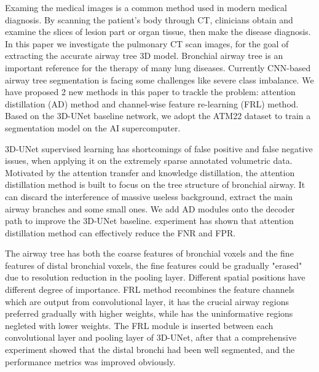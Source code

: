 \begin{abstract*}
  Examing the medical images is a common method used in modern medical diagnosis. By scanning the patient's body through CT, 
  clinicians obtain and examine the slices of lesion part or organ tissue, then make the disease diagnosis. In this paper we
  investigate the pulmonary CT scan images, for the goal of extracting the accurate airway tree 3D model. Bronchial airway
  tree is an important reference for the therapy of many lung diseases. Currently CNN-based airway tree segmentation is facing 
  some challenges like severe class imbalance. We have proposed 2 new methods in this paper to trackle the problem: attention distillation (AD) method 
  and channel-wise feature re-learning (FRL) method. Based on the 3D-UNet baseline network, we adopt the ATM22 dataset to train a segmentation model on
  the AI supercomputer.

  3D-UNet supervised learning has shortcomings of false positive and false negative issues, when applying it on the extremely sparse annotated volumetric 
  data. Motivated by the attention transfer and knowledge distillation, the attention distillation method is built to focus on the tree structure of bronchial
  airway. It can discard the interference of massive useless background, extract the main airway branches and some small ones. We add AD modules onto the decoder
  path to improve the 3D-UNet baseline. experiment has shown that attention distillation method can effectively reduce the FNR and FPR.

  The airway tree has both the coarse features of bronchial voxels and the fine features of distal bronchial voxels, the fine features could be gradually 
  "erased" due to resolution reduction in the pooling layer. Different spatial positions have different degree of importance. FRL method recombines the feature channels which 
  are output from convolutional layer, it has the crucial airway regions preferred gradually with higher weights, while has the uninformative regions negleted with lower weights.
  The FRL module is inserted between each convolutional layer and pooling layer of 3D-UNet, after that a comprehensive experiment showed that the distal bronchi had 
  been well segmented, and the performance metrics was improved obviously.
\end{abstract*}
